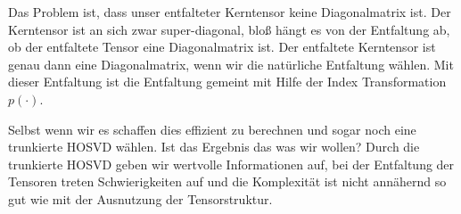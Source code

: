 Das Problem ist, dass unser entfalteter Kerntensor keine Diagonalmatrix ist. Der Kerntensor ist an sich zwar super-diagonal, bloß hängt es von der Entfaltung ab, ob der entfaltete Tensor eine Diagonalmatrix ist. 
Der entfaltete Kerntensor ist genau dann eine Diagonalmatrix, wenn wir die natürliche Entfaltung wählen. Mit dieser Entfaltung ist die Entfaltung gemeint mit Hilfe der Index Transformation $p(\cdot)$.

Selbst wenn wir es schaffen dies effizient zu berechnen und sogar noch eine trunkierte HOSVD wählen. Ist das Ergebnis das was wir wollen? Durch die trunkierte HOSVD geben wir wertvolle Informationen auf, bei der Entfaltung der Tensoren treten Schwierigkeiten auf und die Komplexität ist nicht annähernd so gut wie mit der Ausnutzung der Tensorstruktur.

